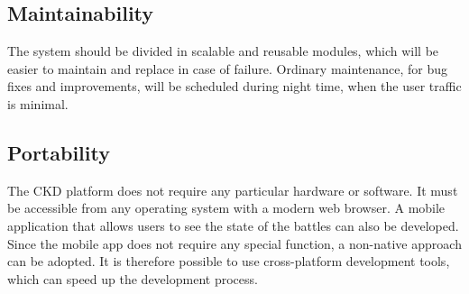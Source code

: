 \subsection{Maintainability}
The system should be divided in scalable and reusable modules,
which will be easier to maintain and replace in case of failure.
Ordinary maintenance, for bug fixes and improvements, will be scheduled during night time, when the user traffic is minimal.

\subsection{Portability}
The CKD platform does not require any particular hardware or software.
It must be accessible from any operating system with a modern web browser.
A mobile application that allows users to see the state of the battles can also be developed.
Since the mobile app does not require any special function, a non-native approach can be adopted.
It is therefore possible to use cross-platform development tools, which can speed up the development process.